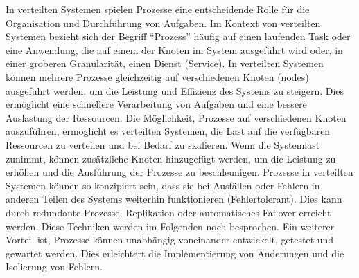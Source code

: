 In verteilten Systemen spielen Prozesse eine entscheidende Rolle für die Organisation und Durchführung von Aufgaben. Im Kontext von verteilten Systemen bezieht sich der Begriff \enquote{Prozess} häufig auf einen laufenden Task oder eine Anwendung, die auf einem der Knoten im System ausgeführt wird oder, in einer groberen Granularität, einen Dienst (Service). In verteilten Systemen können mehrere Prozesse gleichzeitig auf verschiedenen Knoten (nodes) ausgeführt werden, um die Leistung und Effizienz des Systems zu steigern. Dies ermöglicht eine schnellere Verarbeitung von Aufgaben und eine bessere Auslastung der Ressourcen. 
Die Möglichkeit, Prozesse auf verschiedenen Knoten auszuführen, ermöglicht es verteilten Systemen, die Last auf die verfügbaren Ressourcen zu verteilen und bei Bedarf zu skalieren. Wenn die Systemlast zunimmt, können zusätzliche Knoten hinzugefügt werden, um die Leistung zu erhöhen und die Ausführung der Prozesse zu beschleunigen. Prozesse in verteilten Systemen können so konzipiert sein, dass sie bei Ausfällen oder Fehlern in anderen Teilen des Systems weiterhin funktionieren (Fehlertolerant). Dies kann durch redundante Prozesse, Replikation oder automatisches Failover erreicht werden. Diese Techniken werden im Folgenden noch besprochen. Ein weiterer Vorteil ist, Prozesse können unabhängig voneinander entwickelt, getestet und gewartet werden. Dies erleichtert die Implementierung von Änderungen und die Isolierung von Fehlern. \\\\

